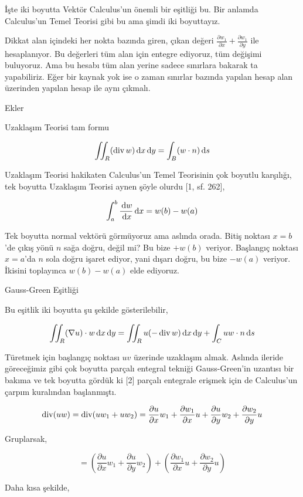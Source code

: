 \documentclass[12pt,fleqn]{article}\usepackage{../../common}
\begin{document}
İşte iki boyutta Vektör Calculus'un önemli bir eşitliği bu. Bir anlamda
Calculus'un Temel Teorisi gibi bu ama şimdi iki boyuttayız.

Dikkat alan içindeki her nokta bazında giren, çıkan değeri $\frac{\partial w_1}{\partial x} + \frac{\partial w_1}{\partial y}  $
ile hesaplanıyor. Bu değerleri tüm alan için entegre ediyoruz, tüm değişimi
buluyoruz. Ama bu hesabı tüm alan yerine sadece sınırlara bakarak ta
yapabiliriz. Eğer bir kaynak yok ise o zaman sınırlar bazında yapılan hesap
alan üzerinden yapılan hesap ile aynı çıkmalı.

Ekler

Uzaklaşım Teorisi tam formu

$$
\iint_R (\operatorname{div} w) \,\mathrm{d} x \,\mathrm{d} y = \int_B  ( w \cdot n ) \,\mathrm{d} s
$$

Uzaklaşım Teorisi hakikaten Calculus'un Temel Teorisinin çok boyutlu karşılığı,
tek boyutta Uzaklaşım Teorisi aynen şöyle olurdu [1, sf. 262],

$$
\int_{a}^{b} \frac{\,\mathrm{d} w}{\,\mathrm{d} x} \,\mathrm{d} x = w(b) - w(a)
$$

Tek boyutta normal vektörü görmüyoruz ama aslında orada. Bitiş noktası
$x=b$'de çıkış yönü $n$ sağa doğru, değil mi? Bu bize $+w(b)$ veriyor.
Başlangıç noktası $x=a$'da $n$ sola doğru işaret ediyor, yani dışarı doğru,
bu bize $-w(a)$ veriyor. İkisini toplayınca $w(b) - w(a)$ elde ediyoruz.

Gauss-Green Eşitliği

Bu eşitlik iki boyutta şu şekilde gösterilebilir,

$$
\iint_R (\nabla u ) \cdot w \,\mathrm{d} x \,\mathrm{d} y =
\iint_R u (- \operatorname{div} w) \,\mathrm{d} x \,\mathrm{d} y + \int_C u w \cdot n \,\mathrm{d} s
$$

Türetmek için başlangıç noktası $uv$ üzerinde uzaklaşım almak. Aslında
ileride göreceğimiz gibi çok boyutta parçalı entegral tekniği Gauss-Green'in
uzantısı bir bakıma ve tek boyutta gördük ki [2] parçalı entegrale erişmek
için de Calculus'un çarpım kuralından başlanmıştı.

$$
\operatorname{div} (uw) = \operatorname{div} (u w_1 + u w_2) =
\frac{\partial u}{\partial x} w_1 +
\frac{\partial w_1}{\partial x} u +
\frac{\partial u}{\partial y} w_2 +
\frac{\partial w_2}{\partial y} u 
$$

Gruplarsak,

$$
= \left( 
\frac{\partial u}{\partial x} w_1 +
\frac{\partial u}{\partial y} w_2 \right) +
\left( 
\frac{\partial w_1}{\partial x} u +
\frac{\partial w_2}{\partial y} u \right)
$$

Daha kısa şekilde,
\end{document}
